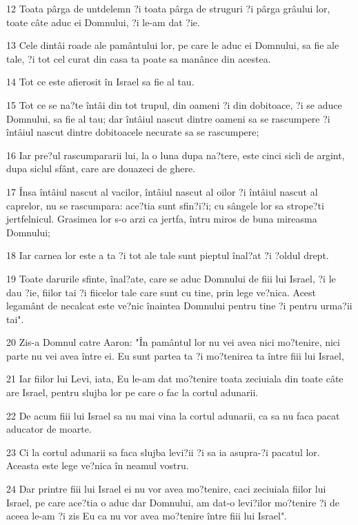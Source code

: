 \par 12 Toata pârga de untdelemn ?i toata pârga de struguri ?i pârga grâului lor, toate câte aduc ei Domnului, ?i le-am dat ?ie.
\par 13 Cele dintâi roade ale pamântului lor, pe care le aduc ei Domnului, sa fie ale tale, ?i tot cel curat din casa ta poate sa manânce din acestea.
\par 14 Tot ce este afierosit în Israel sa fie al tau.
\par 15 Tot ce se na?te întâi din tot trupul, din oameni ?i din dobitoace, ?i se aduce Domnului, sa fie al tau; dar întâiul nascut dintre oameni sa se rascumpere ?i întâiul nascut dintre dobitoacele necurate sa se rascumpere;
\par 16 Iar pre?ul rascumpararii lui, la o luna dupa na?tere, este cinci sicli de argint, dupa siclul sfânt, care are douazeci de ghere.
\par 17 Însa întâiul nascut al vacilor, întâiul nascut al oilor ?i întâiul nascut al caprelor, nu se rascumpara: ace?tia sunt sfin?i?i; cu sângele lor sa strope?ti jertfelnicul. Grasimea lor s-o arzi ca jertfa, întru miros de buna mireasma Domnului;
\par 18 Iar carnea lor este a ta ?i tot ale tale sunt pieptul înal?at ?i ?oldul drept.
\par 19 Toate darurile sfinte, înal?ate, care se aduc Domnului de fiii lui Israel, ?i le dau ?ie, fiilor tai ?i fiicelor tale care sunt cu tine, prin lege ve?nica. Acest legamânt de necalcat este ve?nic înaintea Domnului pentru tine ?i pentru urma?ii tai".
\par 20 Zis-a Domnul catre Aaron: "În pamântul lor nu vei avea nici mo?tenire, nici parte nu vei avea între ei. Eu sunt partea ta ?i mo?tenirea ta între fiii lui Israel,
\par 21 Iar fiilor lui Levi, iata, Eu le-am dat mo?tenire toata zeciuiala din toate câte are Israel, pentru slujba lor pe care o fac la cortul adunarii.
\par 22 De acum fiii lui Israel sa nu mai vina la cortul adunarii, ca sa nu faca pacat aducator de moarte.
\par 23 Ci la cortul adunarii sa faca slujba levi?ii ?i sa ia asupra-?i pacatul lor. Aceasta este lege ve?nica în neamul vostru.
\par 24 Dar printre fiii lui Israel ei nu vor avea mo?tenire, caci zeciuiala fiilor lui Israel, pe care ace?tia o aduc dar Domnului, am dat-o levi?ilor mo?tenire ?i de aceea le-am ?i zis Eu ca nu vor avea mo?tenire între fiii lui Israel".
